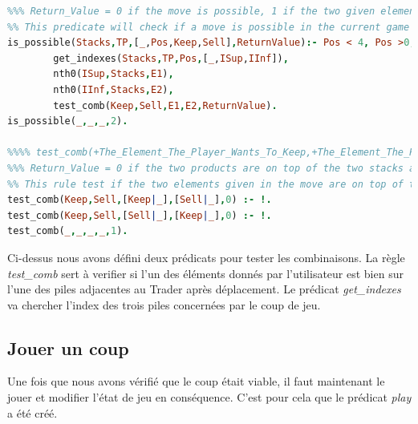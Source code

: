 \documentclass[a4paper, 11pt,twoside, leqno]{report}
\theoremstyle{plain}
\begin{document}
\begin{lstlisting}[language=prolog]
%%%% is_possible(+List_Of_Stacks,+Current_Trader_Position,+Move_The_Player_Wants_To_Make,?Return_Value)
%%% Return_Value = 0 if the move is possible, 1 if the two given element are not on the two stacks adjacent ot the Trader position, 2 if the move applied to the Trader is not in [1,2,3].
%% This predicate will check if a move is possible in the current game configuration.
is_possible(Stacks,TP,[_,Pos,Keep,Sell],ReturnValue):- Pos < 4, Pos >0, !,
		get_indexes(Stacks,TP,Pos,[_,ISup,IInf]),
		nth0(ISup,Stacks,E1),
		nth0(IInf,Stacks,E2),
		test_comb(Keep,Sell,E1,E2,ReturnValue).
is_possible(_,_,_,2).

%%%% test_comb(+The_Element_The_Player_Wants_To_Keep,+The_Element_The_Player_Wants_To_Sell,+One_Of_The_Adjacent_Stack,+The_Other_Adjacent_Stack,?The_Return_Value)
%%% Return_Value = 0 if the two products are on top of the two stacks adjacent to the Trader's position, = 1 otherwise.
%% This rule test if the two elements given in the move are on top of the two adjacent stacks of the Trader stack.
test_comb(Keep,Sell,[Keep|_],[Sell|_],0) :- !.
test_comb(Keep,Sell,[Sell|_],[Keep|_],0) :- !.
test_comb(_,_,_,_,1).
\end{lstlisting}

Ci-dessus nous avons défini deux prédicats pour tester les combinaisons. La règle \textit{test\_{}comb} sert à verifier si l'un des éléments donnés par l'utilisateur est bien sur l'une des piles adjacentes au Trader après déplacement. Le prédicat \textit{get\_{}indexes} va chercher l'index des trois piles concernées par le coup de jeu.

\subsection{Jouer un coup}
Une fois que nous avons vérifié que le coup était viable, il faut maintenant le jouer et modifier l'état de jeu en conséquence. C'est pour cela que le prédicat \textit{play} a été créé. 
\end{document}
